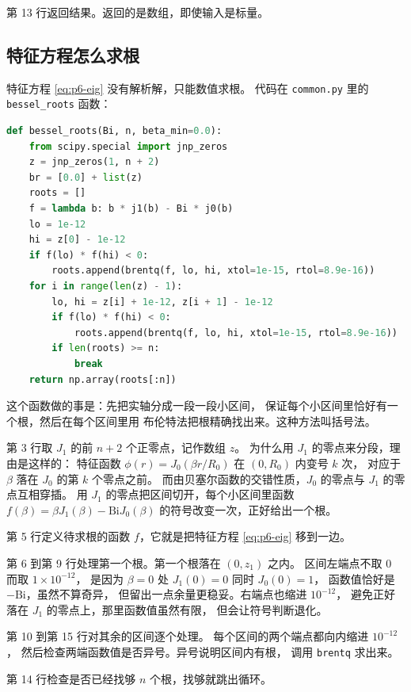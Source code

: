 第 13 行返回结果。返回的是数组，即使输入是标量。

\subsection{特征方程怎么求根}

特征方程 \eqref{eq:p6-eig} 没有解析解，只能数值求根。
代码在 \texttt{common.py} 里的 \texttt{bessel\_roots} 函数：

\begin{lstlisting}[language=Python]
def bessel_roots(Bi, n, beta_min=0.0):
    from scipy.special import jnp_zeros
    z = jnp_zeros(1, n + 2)
    br = [0.0] + list(z)
    roots = []
    f = lambda b: b * j1(b) - Bi * j0(b)
    lo = 1e-12
    hi = z[0] - 1e-12
    if f(lo) * f(hi) < 0:
        roots.append(brentq(f, lo, hi, xtol=1e-15, rtol=8.9e-16))
    for i in range(len(z) - 1):
        lo, hi = z[i] + 1e-12, z[i + 1] - 1e-12
        if f(lo) * f(hi) < 0:
            roots.append(brentq(f, lo, hi, xtol=1e-15, rtol=8.9e-16))
        if len(roots) >= n:
            break
    return np.array(roots[:n])
\end{lstlisting}

这个函数做的事是：先把实轴分成一段一段小区间，
保证每个小区间里恰好有一个根，然后在每个区间里用
布伦特法把根精确找出来。这种方法叫括号法。

第 3 行取 $J_1$ 的前 $n+2$ 个正零点，记作数组 $z$。
为什么用 $J_1$ 的零点来分段，理由是这样的：
特征函数 $\phi(r)=J_0(\beta r/R_0)$ 在 $(0,R_0)$ 内变号 $k$ 次，
对应于 $\beta$ 落在 $J_0$ 的第 $k$ 个零点之前。
而由贝塞尔函数的交错性质，$J_0$ 的零点与 $J_1$ 的零点互相穿插。
用 $J_1$ 的零点把区间切开，每个小区间里函数 $f(\beta)=\beta J_1(\beta)-\mathrm{Bi}J_0(\beta)$
的符号改变一次，正好给出一个根。

第 5 行定义待求根的函数 $f$，它就是把特征方程 \eqref{eq:p6-eig} 移到一边。

第 6 到第 9 行处理第一个根。第一个根落在 $(0,z_1)$ 之内。
区间左端点不取 $0$ 而取 $1\times10^{-12}$，
是因为 $\beta=0$ 处 $J_1(0)=0$ 同时 $J_0(0)=1$，
函数值恰好是 $-\mathrm{Bi}$，虽然不算奇异，
但留出一点余量更稳妥。右端点也缩进 $10^{-12}$，
避免正好落在 $J_1$ 的零点上，那里函数值虽然有限，
但会让符号判断退化。

第 10 到第 15 行对其余的区间逐个处理。
每个区间的两个端点都向内缩进 $10^{-12}$，
然后检查两端函数值是否异号。异号说明区间内有根，
调用 \texttt{brentq} 求出来。

第 14 行检查是否已经找够 $n$ 个根，找够就跳出循环。

